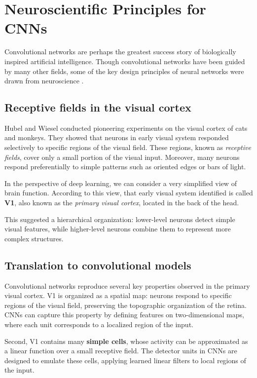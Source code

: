 \chapter{Neuroscientific Principles for CNNs}

Convolutional networks are perhaps the greatest success story of biologically inspired artificial intelligence. Though convolutional networks have been guided by many other fields, some of the key design principles of neural networks were drawn from neuroscience \cite{goodfellow2016deep}.  

\section{Receptive fields in the visual cortex}

Hubel and Wiesel \cite{hubel1968} conducted pioneering experiments on the visual cortex of cats and monkeys. They showed that neurons in early visual system responded selectively to specific regions of the visual field. These regions, known as \textit{receptive fields}, cover only a small portion of the visual input. Moreover, many neurons respond preferentially to simple patterns such as oriented edges or bars of light.

In the perspective of deep learning, we can consider a very simplified view of brain function. According to this view, that early visual system identified is called \textbf{V1}, also known as the \textit{primary visual cortex}, located in the back of the head.

This suggested a hierarchical organization: lower-level neurons detect simple visual features, while higher-level neurons combine them to represent more complex structures.  

\section{Translation to convolutional models}

Convolutional networks reproduce several key properties observed in the primary visual cortex. V1 is organized as a spatial map: neurons respond to specific regions of the visual field, preserving the topographic organization of the retina.  
CNNs can capture this property by defining features on two-dimensional maps, where each unit corresponds to a localized region of the input.  

Second, V1 contains many \textbf{simple cells}, whose activity can be approximated as a linear function over a small receptive field.  
The detector units in CNNs are designed to emulate these cells, applying learned linear filters to local regions of the input.  

